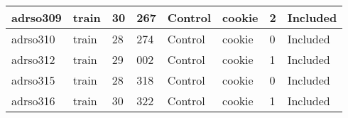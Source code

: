 \begin{center}
\begin{longtable}{|l|l|l|l|l|l|l|l|}
adrso309       & train                 & 30              & 267                & Control              & cookie          & 2                & Included      \\ \hline
adrso310       & train                 & 28              & 274                & Control              & cookie          & 0                & Included      \\ \hline
adrso312       & train                 & 29              & 002                & Control              & cookie          & 1                & Included      \\ \hline
adrso315       & train                 & 28              & 318                & Control              & cookie          & 0                & Included      \\ \hline
adrso316       & train                 & 30              & 322                & Control              & cookie          & 1                & Included      \\ \hline
\end{longtable}
\normalsize
\end{center}
